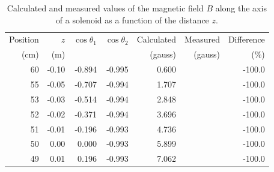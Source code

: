 \documentclass[../Elmag-labhefte-2020.tex]{subfiles}
\begin{document}
\begin{table}[h]
  \centering
  \caption{Calculated and measured values of the magnetic field $B$ along the axis of a solenoid as a function of the distance $z$.\label{tab:example-table3}}
  \scriptsize
  \begin{tabular}{rrrrrrr}
    \hline
    Position & $z$ & $\cos \theta_1$ & $\cos \theta _2$ & Calculated & Measured & Difference\\
    (cm) & (m) & & & (gauss) & (gauss) & (\%)\\
    \hline
60 & -0.10 & -0.894 & -0.995 & 0.600 &  & -100.0\\
55 & -0.05 & -0.707 & -0.994 & 1.707 &  & -100.0\\
53 & -0.03 & -0.514 & -0.994 & 2.848 &  & -100.0\\
52 & -0.02 & -0.371 & -0.994 & 3.696 &  & -100.0\\
51 & -0.01 & -0.196 & -0.993 & 4.736 &  & -100.0\\
50 & 0.00 & 0.000 & -0.993 & 5.899 &  & -100.0\\
49 & 0.01 & 0.196 & -0.993 & 7.062 &  & -100.0\\
  \end{tabular}
\end{table}
%
\begin{tabular}{rrrrrlr}
\end{tabular}

\end{document}
